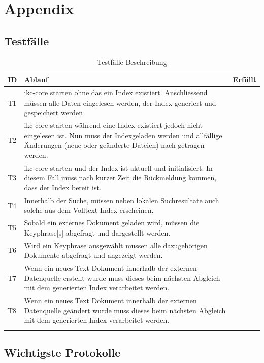 \chapter{Appendix}

\section{Testfälle} \label{tests}

\begin{longtable}{|p{1cm} | p{10cm} |p{1.2cm} |}
  \hline
    ID & Ablauf & Erfüllt \\\hline
    T1 & \gls{ikc-core} starten ohne das ein Index existiert. Anschliessend müssen alle Daten eingelesen werden, der Index generiert und gespeichert werden& \\\hline
    T2 & \gls{ikc-core} starten während eine Index existiert jedoch nicht eingelesen ist. Nun muss der Indexgeladen werden und allfällige Änderungen (neue oder geänderte Dateien) nach getragen werden.\\\hline
    T3 & \gls{ikc-core} starten und der Index ist aktuell und initialisiert. In diesem Fall muss nach kurzer Zeit die Rückmeldung kommen, dass der Index bereit ist.\\\hline
    T4 & Innerhalb der Suche, müssen neben lokalen Suchresultate auch solche aus dem Volltext Index erscheinen. \\\hline
    T5 & Sobald ein externes Dokument geladen wird, müssen die \gls{Keyphrase}[s] abgefragt und dargestellt werden.\\\hline
    T6 & Wird ein \gls{Keyphrase} ausgewählt müssen alle dazugehörigen Dokumente abgefragt und angezeigt werden.\\\hline
    T7 & Wenn ein neues Text Dokument innerhalb der externen Datenquelle erstellt wurde muss dieses beim nächsten Abgleich mit dem generierten Index verarbeitet werden.\\\hline
    T8 & Wenn ein neues Text Dokument innerhalb der externen Datenquelle geändert wurde muss dieses beim nächsten Abgleich mit dem generierten Index verarbeitet werden.\\\hline
    \caption{Testfälle Beschreibung}
  \label{tab:testkonzept-detail}
\end{longtable}



\section{Wichtigste Protokolle}
\label{protokolle}



